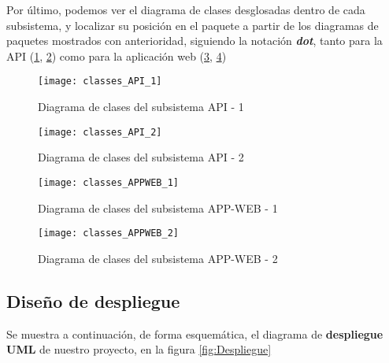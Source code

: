 Por último, podemos ver el diagrama de clases desglosadas dentro de cada subsistema, y localizar su posición en el paquete a partir de los diagramas de paquetes mostrados con anterioridad, siguiendo la notación \textit{\textbf{dot}}, tanto para la API (\ref{fig:classes_API_1}, \ref{fig:classes_API_2}) como para la aplicación web (\ref{fig:classes_APPWEB_1}, \ref{fig:classes_APPWEB_2})

\begin{landscape}
\begin{figure}
    \centering
    \texttt{[image: classes\_API\_1]}
    \caption{Diagrama de clases del subsistema API - 1}
    \label{fig:classes_API_1}
\end{figure}
\begin{figure}
    \centering
    \texttt{[image: classes\_API\_2]}
    \caption{Diagrama de clases del subsistema API - 2}
    \label{fig:classes_API_2}
\end{figure}
\end{landscape}

\begin{landscape}
\begin{figure}
    \centering
    \texttt{[image: classes\_APPWEB\_1]}
    \caption{Diagrama de clases del subsistema APP-WEB - 1}
    \label{fig:classes_APPWEB_1}
\end{figure}
\begin{figure}
    \centering
    \texttt{[image: classes\_APPWEB\_2]}
    \caption{Diagrama de clases del subsistema APP-WEB - 2}
    \label{fig:classes_APPWEB_2}
\end{figure}
\end{landscape}

\subsection{Diseño de despliegue}

Se muestra a continuación, de forma esquemática, el diagrama de \textbf{despliegue UML} de nuestro proyecto, en la figura \ref{fig:Despliegue}


